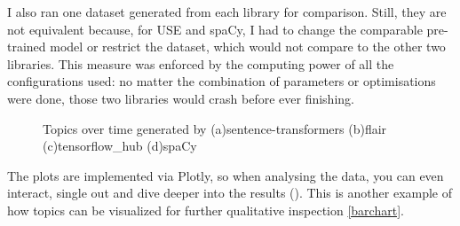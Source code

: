 \documentclass[12pt,MSc,a4paper,oneside]{muthesis}
\begin{document}
I also ran one dataset generated from each library for comparison. Still, they are not equivalent because, for USE and spaCy, I had to change the comparable pre-trained model or restrict the dataset, which would not compare to the other two libraries. This measure was enforced by the computing power of all the configurations used: no matter the combination of parameters or optimisations were done, those two libraries would crash before ever finishing.

\begin{figure}[t]
    \centering
    \caption{Topics over time generated by (a)sentence-transformers (b)flair (c)tensorflow\_hub (d)spaCy}
    \label{fig:foobar}
\end{figure}

The plots are implemented via Plotly, so when analysing the data, you can even interact, single out and dive deeper into the results (\cite{bertopic-online}). This is another example of how topics can be visualized for further qualitative inspection \ref{barchart}.
\end{document}
